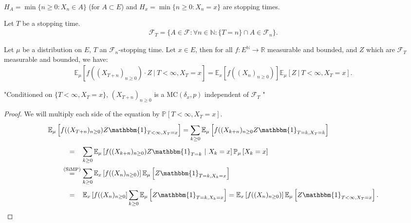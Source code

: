 \begin{ex}
	$H_{A}=\min\{n \geq 0: X_n \in  A\}$ (for $A \subset E$) and $H_x=\min\{n\geq 0: X_n = x\}$ are stopping times.
\end{ex}

\begin{defn}
	Let $T$ be a stopping time. 
	\begin{align}
	\mathcal{F}_T=\{A \in \mathcal{F}: \forall n \in \mathbb{N}: \{T=n\}\cap A \in \mathcal{F}_n \}.
	\end{align}
\end{defn}

\begin{theorem}
	Let $\mu $ be a distribution on $E$, $T$ an $ \mathcal{F}_n$-stopping time. Let $x \in E$,
	then for all $f:E^{\mathbb{N}} \to \mathbb{R}$ measurable and bounded, and $Z$ which are $ \mathcal{F}_T$ measurable and bounded, we have:
\begin{align}
	\boxed{ \mathbb{E}_{\mu } \left[ f((X_{T+n})_{n\geq 0}) \cdot Z \ | \ T<\infty, X_T=x \right] = \mathbb{E}_{x} \left[ f((X_n)_{n\geq 0}) \right]  \mathbb{E}_{\mu } \left[ Z \ | \ T<\infty, X_T=x \right].} 
\end{align}
\end{theorem}
\noindent
"Conditioned on $\{T<\infty,X_T=x\}$, $(X_{T+n})_{n\geq 0}$ is a $ \textrm{MC}(\delta_x,p)$ independent of $ \mathcal{F}_T$ "
\begin{proof}
We will multiply each side of the equation by $\mathbb{P}_{} \left[ T < \infty, X_T =x \right]$.
\begin{align}
&	\mathbb{E}_{\mu } \left[ f((X_{T+n})_{n\geq 0})Z \mathbbm{1}_{T<\infty, X_T=x}  \right] =
		\sum_{k\geq 0}^{} \mathbb{E}_{\mu } \left[ f((X_{k+n})_{n\geq 0} Z \mathbbm{1}_{T=k, X_T=k}  \right] \\
&\qquad	\stackrel{\phantom{\text{(SiMP)}}}{=}  \sum_{k\geq 0}^{} \mathbb{E}_{\mu } \left[ f((X_{k+n})_{n\geq 0}) Z \mathbbm{1}_{T=k} \ | \ X_k = x \right] \mathbb{P}_{\mu } \left[ X_k = x  \right] \\ 
&\qquad	\stackrel{\text{(SiMP)}}{=} \sum_{k\geq 0}^{} \mathbb{E}_{x} \left[ f((X_{n})_{n\geq 0}) \right] \mathbb{E}_{\mu } \left[ Z \mathbbm{1}_{T=k, X_k = x}  \right] \\
&\qquad	\stackrel{\phantom{\text{(SiMP)}}}{=} \mathbb{E}_{x} \left[ f((X_n)_{n\geq 0} \right] \sum_{k\geq 0}^{} \mathbb{E}_{\mu } \left[ Z \mathbbm{1}_{T=k, X_k=x}  \right]  
		= \mathbb{E}_{x} \left[ f((X_n)_{n\geq 0}) \right] \mathbb{E}_{\mu } \left[ Z \mathbbm{1}_{T<\infty, X_T=x}  \right] 
.\end{align}
\end{proof}


